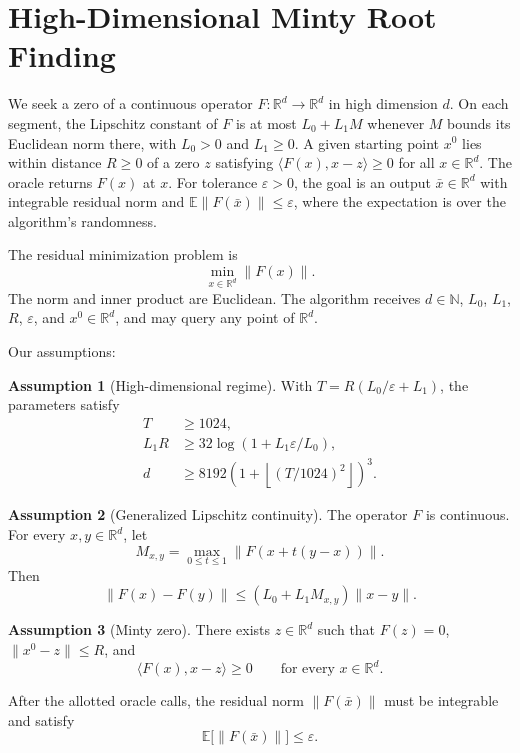 \documentclass[10pt]{article}
\theoremstyle{definition}
\newtheorem{assumption}{Assumption}
\begin{document}
\section*{High-Dimensional Minty Root Finding}
We seek a zero of a continuous operator $F:\mathbb{R}^d\to\mathbb{R}^d$ in high dimension $d$. On each segment, the Lipschitz constant of $F$ is at most $L_0+L_1 M$ whenever $M$ bounds its Euclidean norm there, with $L_0>0$ and $L_1\geq0$. A given starting point $x^0$ lies within distance $R\geq0$ of a zero $z$ satisfying $\langle F(x),x-z\rangle\geq0$ for all $x\in\mathbb{R}^d$. The oracle returns $F(x)$ at $x$. For tolerance $\varepsilon>0$, the goal is an output $\bar{x}\in\mathbb{R}^d$ with integrable residual norm and $\mathbb{E}\|F(\bar{x})\|\leq\varepsilon$, where the expectation is over the algorithm's randomness.

The residual minimization problem is
\[
\min_{x\in\mathbb{R}^d}\|F(x)\|.
\]
The norm and inner product are Euclidean. The algorithm receives $d\in\mathbb{N}$, $L_0$, $L_1$, $R$, $\varepsilon$, and $x^0\in\mathbb{R}^d$, and may query any point of $\mathbb{R}^d$.

Our assumptions:
\begin{assumption}[High-dimensional regime]
With $T=R(L_0/\varepsilon+L_1)$, the parameters satisfy
\[
\begin{aligned}
T &\geq 1024,\\
L_1 R &\geq 32\log(1+L_1\varepsilon/L_0),\\
d &\geq 8192\left(1+\left\lfloor (T/1024)^2\right\rfloor\right)^3.
\end{aligned}
\]
\end{assumption}

\begin{assumption}[Generalized Lipschitz continuity]
The operator $F$ is continuous. For every $x,y\in\mathbb{R}^d$, let
\[
M_{x,y}=\max_{0\leq t\leq 1}\|F(x+t(y-x))\|.
\]
Then
\[
\|F(x)-F(y)\|\leq (L_0+L_1 M_{x,y})\|x-y\|.
\]
\end{assumption}

\begin{assumption}[Minty zero]
There exists $z\in\mathbb{R}^d$ such that $F(z)=0$, $\|x^0-z\|\leq R$, and
\[
\langle F(x),x-z\rangle\geq 0\qquad\text{for every }x\in\mathbb{R}^d.
\]
\end{assumption}

After the allotted oracle calls, the residual norm $\|F(\bar{x})\|$ must be integrable and satisfy
\[
\mathbb{E}\bigl[\|F(\bar{x})\|\bigr]\leq\varepsilon.
\]
\end{document}

